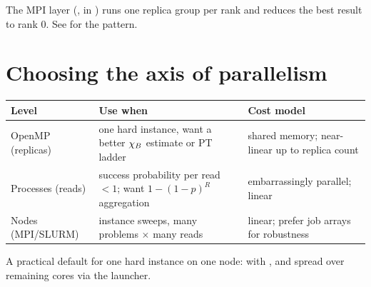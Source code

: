 The MPI layer (,  in
) runs one replica group per rank and reduces the
best result to rank 0. See  for the pattern.

\section{Choosing the axis of parallelism}

\begin{center}
\small
\begin{tabular}{@{}lp{5.2cm}p{5.6cm}@{}}
\toprule
\textbf{Level} & \textbf{Use when} & \textbf{Cost model}\\
\midrule
OpenMP (replicas) & one hard instance, want a better $\chi_B$ estimate or PT
ladder & shared memory; near-linear up to replica count\\
Processes (reads) & success probability per read $<1$; want
$1-(1-p)^R$ aggregation & embarrassingly parallel; linear\\
Nodes (MPI/SLURM) & instance sweeps, many problems $\times$ many reads &
linear; prefer job arrays for robustness\\
\bottomrule
\end{tabular}
\end{center}

A practical default for one hard instance on one node: 
with , and  spread over remaining
cores via the launcher.
